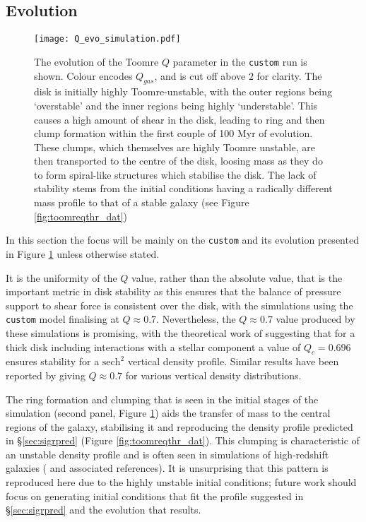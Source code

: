 \subsection{Evolution}

\begin{figure}[!ht]
    \texttt{[image: Q\_evo\_simulation.pdf]}
    \caption{The evolution of the Toomre $Q$ parameter in the {\tt custom} run is shown. Colour encodes $Q_{gas}$, and is cut off above $2$ for clarity. The disk is initially highly Toomre-unstable, with the outer regions being `overstable' and the inner regions being highly `understable'. This causes a high amount of shear in the disk, leading to ring and then clump formation within the first couple of 100 Myr of evolution. These clumps, which themselves are highly Toomre unstable, are then transported to the centre of the disk, loosing mass as they do to form spiral-like structures which stabilise the disk. The lack of stability stems from the initial conditions having a radically different mass profile to that of a stable galaxy (see Figure \ref{fig:toomreqthr_dat})}
    \label{fig:toomqsimsmallfig}
\end{figure}

In this section the focus will be mainly on the {\tt custom} and its evolution presented in Figure \ref{fig:toomqsimsmallfig} unless otherwise stated.

It is the uniformity of the $Q$ value, rather than the absolute value, that is the important metric in disk stability as this ensures that the balance of pressure support to shear force is consistent over the disk, with the simulations using the {\tt custom} model finalising at $Q \approx 0.7$.
Nevertheless, the $Q\approx 0.7$ value produced by these simulations is promising, with the theoretical work of \citet{behrendt_structure_2015} suggesting that for a thick disk including interactions with a stellar component a value of $Q_c = 0.696$ ensures stability for a $\mathrm{sech}^2$ vertical density profile.
Similar results have been reported by \citet{kim_three-dimensional_2002, wang_equilibrium_2010} giving $Q \approx 0.7$ for various vertical density distributions.

The ring formation and clumping that is seen in the initial stages of the simulation (second panel, Figure \ref{fig:toomqsimsmallfig}) aids the transfer of mass to the central regions of the galaxy, stabilising it and reproducing the density profile predicted in \S\ref{sec:sigrpred} (Figure \ref{fig:toomreqthr_dat}).
This clumping is characteristic of an unstable density profile and is often seen in simulations of high-redshift galaxies (\citet{bournaud_bulge_2016} and associated references).
It is unsurprising that this pattern is reproduced here due to the highly unstable initial conditions; future work should focus on generating initial conditions that fit the profile suggested in \S \ref{sec:sigrpred} and the evolution that results.


